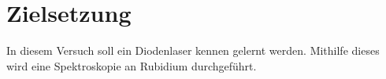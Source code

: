 \section{Zielsetzung}
\label{sec:zielsetzung}
In diesem Versuch soll ein Diodenlaser kennen gelernt werden. Mithilfe dieses wird eine Spektroskopie an Rubidium durchgeführt.
